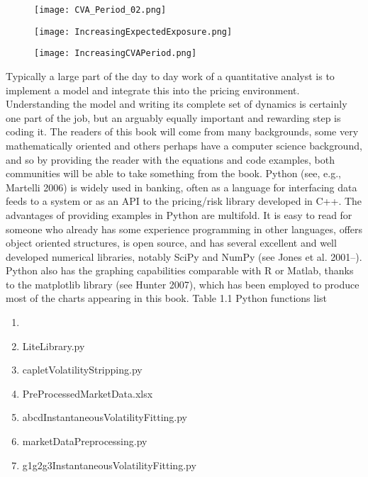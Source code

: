 \documentclass[11pt]{article}
\numberwithin{equation}{subsection}
\begin{document}
\begin{figure}[H]
	\texttt{[image: CVA\_Period\_02.png]}
\end{figure}

\begin{figure}[H]
	\texttt{[image: IncreasingExpectedExposure.png]}
\end{figure}

\begin{figure}[H]
	\texttt{[image: IncreasingCVAPeriod.png]}
\end{figure}


Typically a large part of the day to day work of a quantitative analyst is to implement a model and integrate this into the pricing environment. Understanding the model and writing its complete set of dynamics is certainly one part of the job, but an arguably equally important and rewarding step is coding it. The readers of this book will come from many backgrounds, some very mathematically oriented and others perhaps have a computer science background, and so by providing the reader with the equations and code examples, both communities will be able to take something from the book. Python (see, e.g., Martelli 2006) is widely used in banking, often as a language for interfacing data feeds to a system or as an API to the pricing/risk library developed in C++. The advantages of providing examples in Python are multifold. It is easy to read for someone who already has some experience programming in other languages, offers object oriented structures, is open source, and has several excellent and well developed numerical libraries, notably SciPy and NumPy (see Jones et al. 2001–). Python also has the graphing capabilities comparable with R or Matlab, thanks to the matplotlib library (see Hunter 2007), which has been employed to produce most of the charts appearing in this book. Table 1.1   Python functions list

\begin{enumerate}
	\item 
	\item LiteLibrary.py
	\item capletVolatilityStripping.py
	\item PreProcessedMarketData.xlsx
	\item abcdInstantaneousVolatilityFitting.py
	\item marketDataPreprocessing.py
	\item g1g2g3InstantaneousVolatilityFitting.py	
\end{enumerate}
\end{document}
